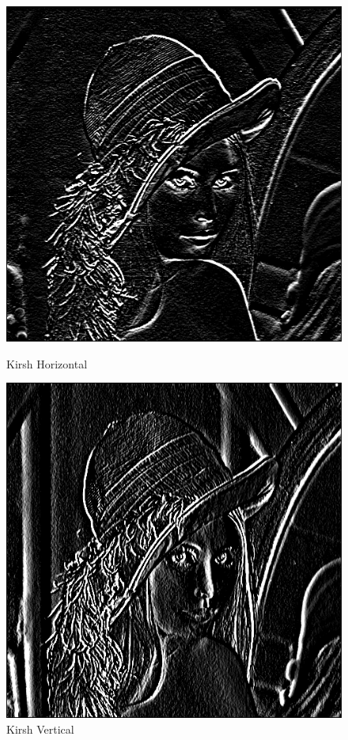 \documentclass[11pt]{article}
\begin{document}
	\begin{figure}[H]
		\begin{minipage}[c]{.46\linewidth}
			\centering
			\includegraphics[scale=0.25]{Image/filtreKirshHorizontal.png}
			\caption{Kirsh Horizontal}
			\label{fig:KirshHorizontal}
		\end{minipage} \hfill
		\begin{minipage}[c]{.46\linewidth}
		\centering
			\includegraphics[scale=0.25]{Image/filtreKirshVertical.png}
			\caption{Kirsh Vertical}
			\label{fig:KirshVertical}
		\end{minipage}
	\end{figure}
\end{document}
